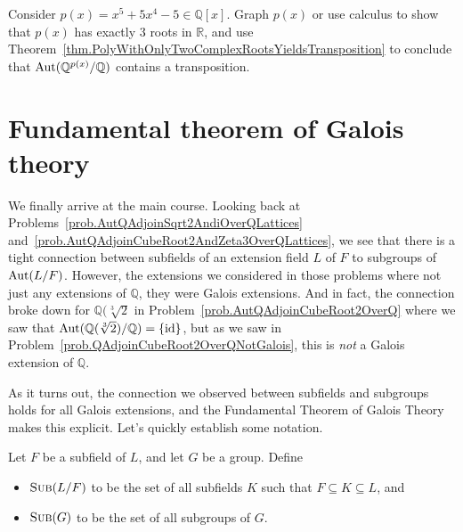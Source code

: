 \begin{problem}
Consider $p(x) = x^5 +5x^4-5 \in \mathbb{Q}[x]$. Graph $p(x)$ or use calculus to show that $p(x)$ has exactly $3$ roots  in $\mathbb{R}$, and use Theorem~\ref{thm.PolyWithOnlyTwoComplexRootsYieldsTransposition} to conclude that $\operatorname{Aut}(\mathbb{Q}^{p(x)}/\mathbb{Q})$ contains a transposition.
\end{problem}

\section{Fundamental theorem of Galois theory}

We finally arrive at the main course. Looking back at Problems~\ref{prob.AutQAdjoinSqrt2AndiOverQLattices} and~\ref{prob.AutQAdjoinCubeRoot2AndZeta3OverQLattices}, we see that there is a tight connection between subfields of an extension  field $L$ of $F$ to subgroups of $\operatorname{Aut}(L/F)$. However, the extensions we considered in those problems where not just any extensions of $\mathbb{Q}$, they were Galois extensions. And in fact, the connection broke down for $\mathbb{Q}(\sqrt[3]{2}$ in Problem~\ref{prob.AutQAdjoinCubeRoot2OverQ} where we saw that $\operatorname{Aut}(\mathbb{Q}(\sqrt[3]{2})/\mathbb{Q}) = \{\text{id}\}$, but as we saw in  Problem~\ref{prob.QAdjoinCubeRoot2OverQNotGalois}, this is \emph{not} a Galois extension of $\mathbb{Q}$. 

As it turns out, the connection we observed between subfields and subgroups holds for all Galois extensions, and the Fundamental Theorem of Galois Theory makes this explicit. Let's quickly establish some notation.

\begin{notation}
Let $F$ be a subfield of $L$, and let $G$ be a group. Define 
\begin{itemize}
\item $\operatorname{\textsc{Sub}}(L/F)$ to be the set of all subfields $K$ such that $F\subseteq K\subseteq L$, and 
\item $\operatorname{\textsc{Sub}}(G)$ to be the set of all subgroups of  $G$.
\end{itemize}
\end{notation}

